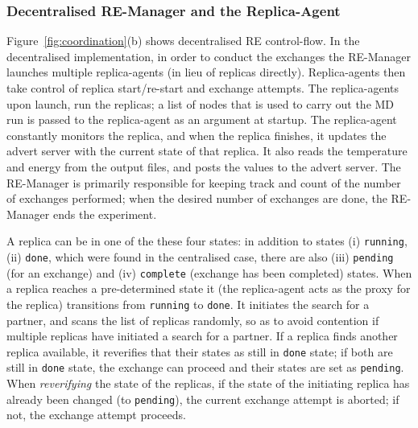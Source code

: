 \documentclass{rspublic}
\newcommand{\jhanote}[1]{ {\textcolor{red} { ***shantenu: #1 }}}
\newcommand{\alnote}[1]{ {\textcolor{blue} { ***andre: #1 }}}
\newcommand{\alnote}[1]{}
\newcommand{\jhanote}[1]{}
\begin{document}
\subsubsection{Decentralised RE-Manager and the Replica-Agent}

 

Figure~\ref{fig:coordination}(b) shows %
decentralised RE control-flow.  In the decentralised
implementation, in order to conduct the exchanges the RE-Manager
launches multiple replica-agents (in lieu of replicas directly).
Replica-agents then take control of replica start/re-start and
exchange attempts.  The replica-agents upon launch, run the replicas;
a list of nodes that is used to carry out the MD run is passed to the
replica-agent as an argument at startup.  The replica-agent constantly
monitors the replica, and when the replica finishes, it updates the
advert server with the current state of that replica.  It also reads
the temperature and energy from the output files, and posts the values
to the advert server.  The RE-Manager is primarily responsible for
keeping track and count of the number of exchanges performed; when the
desired number of exchanges are done, the RE-Manager ends the
experiment.

A replica can be in one of the these four states: in addition to
states (i) \texttt{running}, (ii) \texttt{done}, which were found in
the centralised case, there are also (iii) \texttt{pending} (for an
exchange) and (iv) \texttt{complete} (exchange has been completed) states.
When a replica reaches a pre-determined state it (the replica-agent
acts as the proxy for the replica) transitions from \texttt{running}
to \texttt{done}. It initiates the search for a partner, and scans the
list of replicas randomly, so as to avoid contention if multiple
replicas have initiated a search for a partner.  If a replica finds
another replica available, it reverifies that their states as still in
\texttt{done} state; if both are still in \texttt{done} state, the
exchange can proceed and their states are set as \texttt{pending}.
When {\it reverifying} the state of the replicas, if the state of the
initiating replica has already been changed (to \texttt{pending}), the
current exchange attempt is aborted; if not, the exchange attempt
proceeds.
\end{document}
